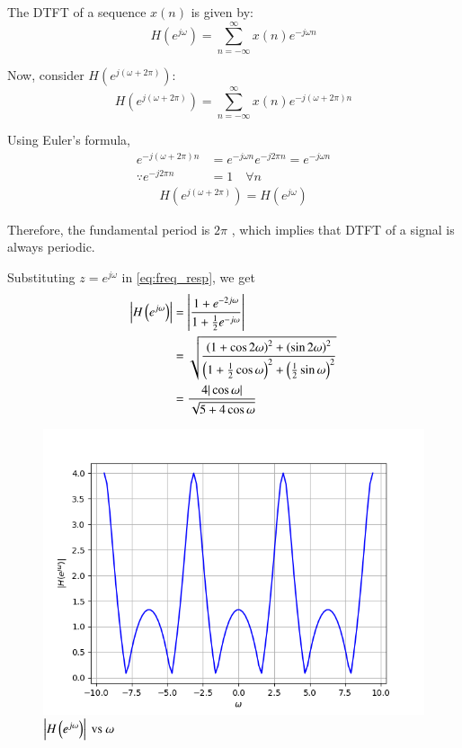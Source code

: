 \documentclass[journal,12pt,twocolumn]{IEEEtran}
\theoremstyle{remark}
\renewcommand\thesection{\arabic{section}}
\numberwithin{equation}{subsection}
\begin{document}
\begin{enumerate}[label=\thesection.\arabic*]
The DTFT of a sequence \( x(n) \) is given by:
\[ H(e^{j\omega}) = \sum_{n=-\infty}^{\infty} x(n) e^{-j\omega n} \]

Now, consider \( H(e^{j(\omega + 2\pi)}) \):
\[ H(e^{j(\omega + 2\pi)}) = \sum_{n=-\infty}^{\infty} x(n) e^{-j(\omega + 2\pi) n} \]

Using Euler's formula,
\begin{align}
e^{-j(\omega + 2\pi) n} &= e^{-j\omega n} e^{-j2\pi n} = e^{-j\omega n} \\
\because  e^{-j2\pi n} &= 1\quad  \forall{n}
\end{align}
\begin{align}
  H(e^{j(\omega + 2\pi)}) = H(e^{j\omega}) 
\end{align}

Therefore, the fundamental period is $2\pi$ , which implies that DTFT of a signal is always periodic.

Substituting $z = e^{j \omega}$ in \eqref{eq:freq_resp}, we get
\begin{align}
	\left|H\left(e^{j\omega}\right)\right| &= \left|\frac{1 + e^{-2j\omega}}{1 + \frac{1}{2}e^{-j\omega}}\right| \\
	 &= \sqrt{\frac{\left(1 + \cos{2\omega}\right)^2 + \left(\sin{2\omega}\right)^2}{\left(1 + \frac{1}{2}\cos{\omega}\right)^2 + \left(\frac{1}{2}\sin{\omega}\right)^2}}\\
	 &= \frac{4|\cos{\omega}|}{\sqrt{5 + 4\cos{\omega}}}
\end{align}
\begin{figure}[!ht]
\centering
\includegraphics[width=\columnwidth]{figs/H(z).png}
\caption{$\left\vert H\left(e^{j\omega}\right)\right\vert \text{ vs } \omega$}
\label{fig:H(z)_3.5}
\end{figure}
\end{enumerate}
\end{document}
